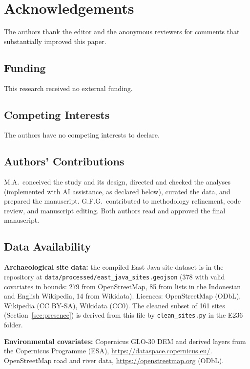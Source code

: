 \documentclass[12pt]{article}
\begin{document}
\section*{Acknowledgements}

The authors thank the editor and the anonymous reviewers for comments that substantially improved this paper.

\subsection*{Funding}
This research received no external funding.

\subsection*{Competing Interests}
The authors have no competing interests to declare.

\subsection*{Authors' Contributions}
M.A.\ conceived the study and its design, directed and checked the analyses (implemented with AI assistance, as declared below), curated the data, and prepared the manuscript.
G.F.G.\ contributed to methodology refinement, code review, and manuscript editing.
Both authors read and approved the final manuscript.

\subsection*{Data Availability}

\textbf{Archaeological site data:} the compiled East Java site dataset is in the repository at \texttt{data/processed/east\_java\_sites.geojson} (378 with valid covariates in bounds: 279 from OpenStreetMap, 85 from lists in the Indonesian and English Wikipedia, 14 from Wikidata). Licences: OpenStreetMap (ODbL), Wikipedia (CC BY-SA), Wikidata (CC0). The cleaned subset of 161 sites (Section~\ref{sec:presence}) is derived from this file by \texttt{clean\_sites.py} in the E236 folder.

\textbf{Environmental covariates:} Copernicus GLO-30 DEM and derived layers from the Copernicus Programme (ESA), \url{https://dataspace.copernicus.eu/}. OpenStreetMap road and river data, \url{https://openstreetmap.org} (ODbL).
\end{document}

